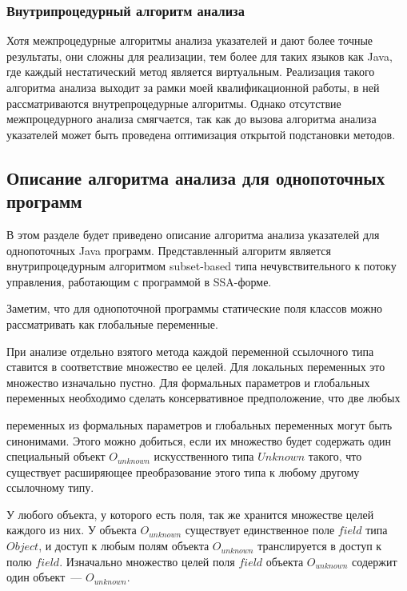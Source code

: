 \documentclass[14pt,titlepage]{extarticle}
\newcommand{\eng}[1]{{\English#1}}
\begin{document}
    \subsubsection{Внутрипроцедурный алгоритм анализа}

      Хотя межпроцедурные алгоритмы анализа указателей и дают более точные
      результаты, они сложны для реализации, тем более для таких
      языков как Java, где каждый нестатический метод является виртуальным.
      Реализация такого алгоритма анализа выходит за рамки моей
      квалификационной работы, в ней рассматриваются внутрепроцедурные
      алгоритмы. Однако отсутствие межпроцедурного анализа смягчается, так
      как до вызова алгоритма анализа указателей может быть проведена
      оптимизация открытой подстановки методов.

    \subsection{Описание алгоритма анализа для однопоточных программ}

      В этом разделе будет приведено описание алгоритма анализа указателей
      для однопоточных Java программ.
      Представленный алгоритм является внутрипроцедурным алгоритмом
      \eng{subset-based} типа нечувствительного к потоку управления,
      работающим с программой в SSA-форме.

      Заметим, что для однопоточной программы статические поля классов можно
      рассматривать как глобальные переменные.

      При анализе отдельно взятого метода каждой переменной ссылочного типа
      ставится в соответствие множество ее целей. Для локальных переменных
      это множество изначально пустно. Для формальных параметров и глобальных
      переменных необходимо сделать консервативное предположение, что две любых

      переменных из формальных параметров и глобальных переменных могут быть
      синонимами. Этого можно добиться, если их множество будет содержать один
      специальный объект $O_{unknown}$ искусственного типа $Unknown$ такого,
      что существует расширяющее преобразование этого типа к любому другому
      ссылочному типу.

      У любого объекта, у которого есть поля, так же хранится множестве целей
      каждого из них. У объекта $O_{unknown}$ существует единственное поле
      $field$ типа $Object$, и доступ к любым полям объекта $O_{unknown}$
      транслируется в доступ к полю $field$. Изначально множество целей
      поля $field$ объекта $O_{unknown}$ содержит один объект~---
      $O_{unknown}$.
\end{document}
